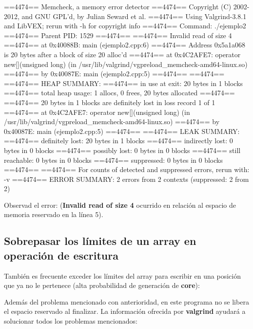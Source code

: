 \documentclass[11pt,a4paper,professionalfonts]{article}
\begin{document}
\vspace{0.4cm}
\begin{javacode}
==4474== Memcheck, a memory error detector
==4474== Copyright (C) 2002-2012, and GNU GPL'd, by Julian Seward et al.
==4474== Using Valgrind-3.8.1 and LibVEX; rerun with -h for copyright info
==4474== Command: ./ejemplo2
==4474== Parent PID: 1529
==4474== 
==4474== Invalid read of size 4
==4474==    at 0x40088B: main (ejemplo2.cpp:6)
==4474==  Address 0x5a1a068 is 20 bytes after a block of size 20 alloc'd
==4474==    at 0x4C2AFE7: operator new[](unsigned long) (in /usr/lib/valgrind/vgpreload_memcheck-amd64-linux.so)
==4474==    by 0x40087E: main (ejemplo2.cpp:5)
==4474== 
==4474== 
==4474== HEAP SUMMARY:
==4474==     in use at exit: 20 bytes in 1 blocks
==4474==   total heap usage: 1 allocs, 0 frees, 20 bytes allocated
==4474== 
==4474== 20 bytes in 1 blocks are definitely lost in loss record 1 of 1
==4474==    at 0x4C2AFE7: operator new[](unsigned long) (in /usr/lib/valgrind/vgpreload_memcheck-amd64-linux.so)
==4474==    by 0x40087E: main (ejemplo2.cpp:5)
==4474== 
==4474== LEAK SUMMARY:
==4474==    definitely lost: 20 bytes in 1 blocks
==4474==    indirectly lost: 0 bytes in 0 blocks
==4474==      possibly lost: 0 bytes in 0 blocks
==4474==    still reachable: 0 bytes in 0 blocks
==4474==         suppressed: 0 bytes in 0 blocks
==4474== 
==4474== For counts of detected and suppressed errors, rerun with: -v
==4474== ERROR SUMMARY: 2 errors from 2 contexts (suppressed: 2 from 2)
\end{javacode}
\vspace{0.4cm}

Observad el error: (\textbf{Invalid read of size 4} ocurrido en relación
al espacio de memoria reservado en la línea 5). 

\subsection{Sobrepasar los límites de un array en operación de escritura}

También es frecuente exceder los límites del array para escribir en una posición 
que ya no le pertenece (alta probabilidad de generación de \textbf{core}):



Además del problema mencionado con anterioridad, en este programa no se libera el 
espacio reservado al finalizar. La información ofrecida por \textbf{valgrind} 
ayudará a solucionar todos los problemas mencionados:
\end{document}
